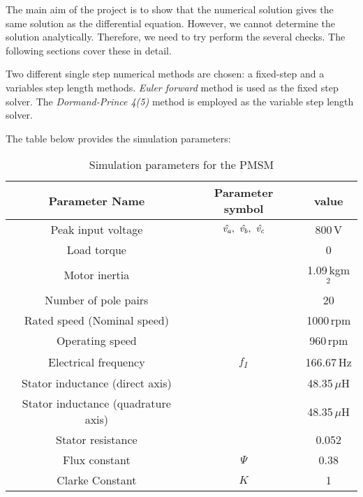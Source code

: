 The main aim of the project is to show that the numerical solution gives the same solution as the differential equation. However, we cannot determine the solution analytically. Therefore, we need to try perform the several checks. The following sections cover these in detail. 

Two different single step numerical methods are chosen: a fixed-step and a variables step length methods. \textit{Euler forward} method is used as the fixed step solver. The \textit{Dormand-Prince 4(5)} method is employed as the variable step length solver.

The table  below provides the simulation parameters:
\begin{table}[h!b!]
	\centering
	\begin{tabular}{c|c|c}
		Parameter Name & Parameter symbol & value \\
		\hline
		Peak input voltage & $\hat \va,\ \hat \vb,\ \hat \vc $ & 800\,V\\
		Load torque & \Tl & 0\\
		Motor inertia & \J & 1.09\,kgm$^2$\\
		Number of pole pairs & \np & 20\\
		Rated speed (Nominal speed) & \Nrnom & 1000\,rpm \\
		Operating speed & \Nr & 960\,rpm \\
		Electrical frequency & \textit{f\textsubscript{1}} & 166.67\,Hz\\
		Stator inductance (direct axis)& \Ld & 48.35\,$\mu$H\\
		Stator inductance (quadrature axis)& \Ld & 48.35\,$\mu$H\\
		Stator resistance & \Rs & 0.052 \\
		Flux constant & $\Psi$ & 0.38 \\
		Clarke Constant & $K$ & 1
	\end{tabular}
	\caption{Simulation parameters for the PMSM}
	\label{tab:simparam}
\end{table}
